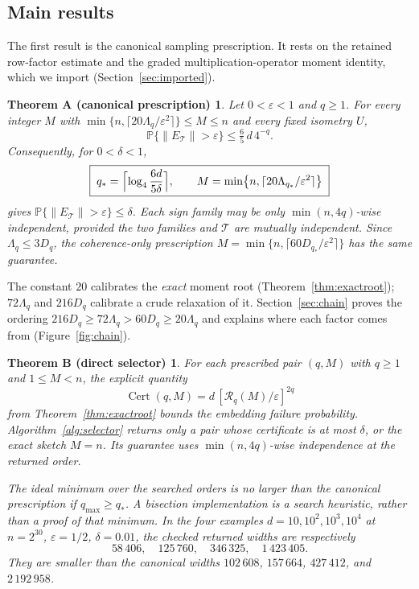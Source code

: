 \documentclass[11pt,a4paper]{article}
\newtheorem*{theoremA}{Theorem A (canonical prescription)}
\newtheorem*{theoremB}{Theorem B (direct selector)}
\theoremstyle{definition}
\theoremstyle{remark}
\numberwithin{equation}{section}
\newcommand{\Prob}{\mathbb P}
\newcommand{\eps}{\varepsilon}
\newcommand{\norm}[1]{\lVert#1\rVert}
\newcommand{\cT}{\mathcal T}
\newcommand{\Cert}{\operatorname{Cert}}
\newcommand{\Rex}{\mathcal R}
\begin{document}
\subsection{Main results}\label{sec:main}
The first result is the canonical sampling prescription. It rests on the
retained row-factor estimate and the graded multiplication-operator moment
identity, which we import (Section~\ref{sec:imported}).

\begin{theoremA}
Let $0<\eps<1$ and $q\ge1$. For every integer $M$ with
$\min\{n,\lceil20\Lambda_q/\eps^2\rceil\}\le M\le n$ and every fixed isometry
$U$,
\[
 \Prob\{\norm{E_\cT}>\eps\}\le\tfrac65\,d\,4^{-q}.
\]
Consequently, for $0<\delta<1$,
\begin{equation}\label{eq:canonical}
 \boxed{\;q_*=\Bigl\lceil\log_4\frac{6d}{5\delta}\Bigr\rceil,\qquad
 M=\min\bigl\{n,\lceil20\Lambda_{q_*}/\eps^2\rceil\bigr\}\;}
\end{equation}
gives $\Prob\{\norm{E_\cT}>\eps\}\le\delta$. Each sign family may be only
$\min(n,4q)$-wise independent, provided the two families and $\cT$ are
mutually independent. Since $\Lambda_q\le3D_q$, the coherence-only
prescription $M=\min\{n,\lceil60D_{q_*}/\eps^2\rceil\}$ has the same
guarantee.
\end{theoremA}

The constant $20$ calibrates the \emph{exact} moment root
(Theorem~\ref{thm:exactroot}); $72\Lambda_q$ and $216D_q$ calibrate a crude
relaxation of it. Section~\ref{sec:chain} proves the ordering
$216D_q\ge72\Lambda_q>60D_q\ge20\Lambda_q$ and explains where each factor
comes from (Figure~\ref{fig:chain}).

\begin{theoremB}
For each prescribed pair $(q,M)$ with $q\ge1$ and $1\le M<n$,
the explicit quantity
\[
 \Cert(q,M)=d\,[\Rex_q(M)/\eps]^{2q}
\]
from Theorem~\ref{thm:exactroot} bounds the embedding failure probability.
Algorithm~\ref{alg:selector} returns only a pair whose certificate is at
most $\delta$, or the exact sketch $M=n$. Its guarantee uses
$\min(n,4q)$-wise independence at the returned order.

The ideal minimum over the searched orders is no larger than the canonical
prescription if $q_{\max}\ge q_*$. A bisection implementation is a search
heuristic, rather than a proof of that minimum. In the four examples
$d=10,10^2,10^3,10^4$ at $n=2^{30}$, $\eps=1/2$, $\delta=0.01$, the
checked returned widths are respectively
\[
 58\,406,\quad125\,760,\quad346\,325,\quad1\,423\,405.
\]
They are smaller than the canonical widths
$102\,608$, $157\,664$, $427\,412$, and $2\,192\,958$.
\end{theoremB}
\end{document}
